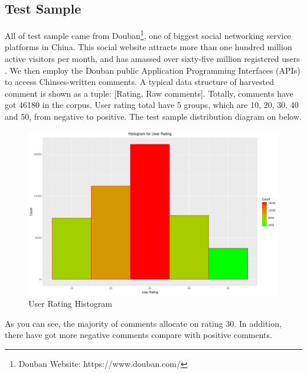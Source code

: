\documentclass[conference]{IEEEtran}
\begin{document}
\begin{CJK*}{UTF8}{gbsn}
\subsection{Test Sample}
All of test sample came from Douban\footnote{Douban Website:
  https://www.douban.com/}, one of biggest social networking service
platforms in China. This social website attracts more than one hundred million
active visitors per month, and has amassed over sixty-five million registered
users \cite{doubanStat}. We then employ the Douban public Application Programming Interfaces
(APIs) to access Chinses-written comments. A typical data structure of harvested
comment is shown as a tuple: [Rating, Raw comments]. Totally, comments have got
46180 in the corpus. User rating total have 5 groups, which are 10, 20, 30, 40
and 50, from negative to positive.
The test sample distribution diagram on below.
\begin{figure}[h]
  \centering
\includegraphics[width=0.3\paperwidth]{./img/ratingHis.png}
\caption{User Rating Histogram}
\label{fig:userRatingHistogram}
\end{figure}
As you can see, the majority of comments allocate on rating 30. In addition,
there have got more negative comments compare with positive comments.


\end{CJK*}
\end{document}
